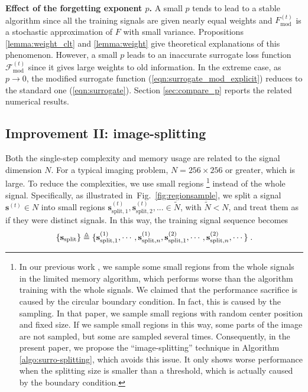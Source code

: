 \documentclass[final]{siamart1116}
\newcommand{\fig}[1]{Fig.~\ref{fig:#1}}
\newcommand{\mb}[1]{\mathbf{#1}}
\def \F  {\mathcal{F}}
\begin{document}
\textbf{Effect of the forgetting exponent $p$.} A small $p$ tends to lead to a stable algorithm since all the training signals are given nearly equal weights and $F^{(t)}_{\mathrm{mod}}$ is a stochastic approximation of $F$ with small variance. Propositions \ref{lemma:weight_clt} and \ref{lemma:weight} give theoretical explanations of this phenomenon.
However, a small $p$ leads to an inaccurate surrogate loss function $\F^{(t)}_{\mathrm{mod}}$ since it gives large weights to old information. In the extreme case, as $p\to0$, the modified surrogate function (\ref{eqn:surrogate_mod_explicit}) reduces to the standard one (\ref{eqn:surrogate}). Section \ref{sec:compare_p} reports the related numerical results.




\subsection{Improvement II: image-splitting}
\label{sec:region-sample}

Both the single-step complexity and memory usage are related to the signal dimension $N$. For a typical imaging problem, $N = 256\times256$ or greater, which is large. To reduce the complexities, we use small regions \footnote{In our previous work \cite{liu-2017-online}, we sample some small regions from the whole signals in the limited memory algorithm, which performs worse than the algorithm training with the whole signals. We claimed that the performance sacrifice is caused by the circular boundary condition. In fact, this is caused by the sampling. In that paper, we sample small regions with random center position and fixed size. If we sample small regions in this way, some parts of the image are not sampled, but some are sampled several times.
Consequently, in the present paper, we propose the ``image-splitting'' technique in Algorithm \ref{algo:surro-splitting}, which avoids this issue. It only shows worse performance when the splitting size is smaller than a threshold, which is actually caused by the boundary condition.}
instead of the whole signal. Specifically, as illustrated in~\fig{regionsample}, we split a signal $\mb{s}^{(t)} \in N$ into small regions ${\mb{s}^{(t)}_{\text{split},1}, \mb{s}^{(t)}_{\text{split},2}, ... } \in \tilde{N}$, with $\tilde{N} < N$, and treat them as if they were distinct signals.  In this way, the training signal sequence becomes
\vspace{-2mm}
\[
\{\mb{s}_{\text{split}}\} \triangleq \{ \mb{s}^{(1)}_{\text{split},1}, \cdots,\mb{s}^{(1)}_{\text{split},n}, \mb{s}^{(2)}_{\text{split},1}, \cdots, \mb{s}^{(2)}_{\text{split},n}, \cdots\} \;.
\vspace{-1mm}
\]
\end{document}

